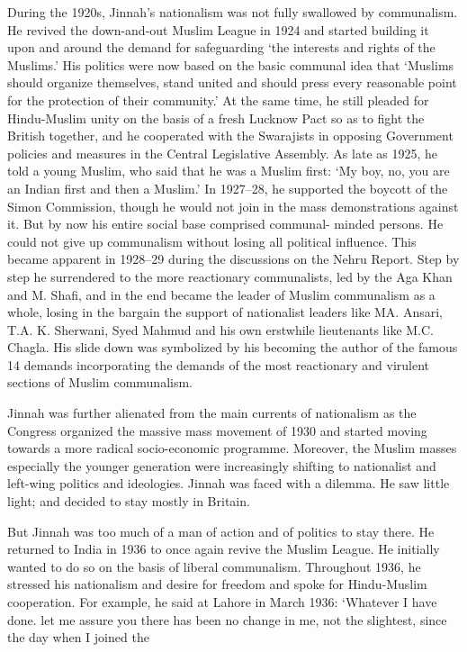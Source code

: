 \begin{multicols}{2}
During the 1920s, Jinnah's nationalism was not fully swallowed by communalism. He revived the down-and-out Muslim League in 1924 and started building it upon and around the demand for safeguarding `the interests and rights of the Muslims.' His politics were now based on the basic communal idea that `Muslims should organize themselves, stand united and should press every reasonable point for the protection of their community.' At the same time, he still pleaded for Hindu-Muslim unity on the basis of a fresh Lucknow Pact so as to fight the British together, and he cooperated with the Swarajists in opposing Government policies and measures in the Central Legislative Assembly. As late as 1925, he told a young Muslim, who said that he was a Muslim first: `My boy, no, you are an Indian first and then a Muslim.' In 1927--28, he supported the boycott of the Simon Commission, though he would not join in the mass demonstrations against it. But by now his entire social base comprised communal- minded persons. He could not give up communalism without losing all political influence. This became apparent in 1928--29 during the discussions on the Nehru Report. Step by step he surrendered to the more reactionary communalists, led by the Aga Khan and M. Shafi, and in the end became the leader of Muslim communalism as a whole, losing in the bargain the support of nationalist leaders like MA. Ansari, T.A. K. Sherwani, Syed Mahmud and his own erstwhile lieutenants like M.C. Chagla. His slide down was symbolized by his becoming the author of the famous 14 demands incorporating the demands of the most reactionary and virulent sections of Muslim communalism. 

Jinnah was further alienated from the main currents of nationalism as the Congress organized the massive mass movement of 1930 and started moving towards a more radical socio-economic programme. Moreover, the Muslim masses especially the younger generation were increasingly shifting to nationalist and left-wing politics and ideologies. Jinnah was faced with a dilemma. He saw little light; and decided to stay mostly in Britain. 

But Jinnah was too much of a man of action and of politics to stay there. He returned to India in 1936 to once again revive the Muslim League. He initially wanted to do so on the basis of liberal communalism. Throughout 1936, he stressed his nationalism and desire for freedom and spoke for Hindu-Muslim cooperation. For example, he said at Lahore in March 1936: `Whatever I have done. let me assure you there has been no change in me, not the slightest, since the day when I joined the 


\end{multicols}
